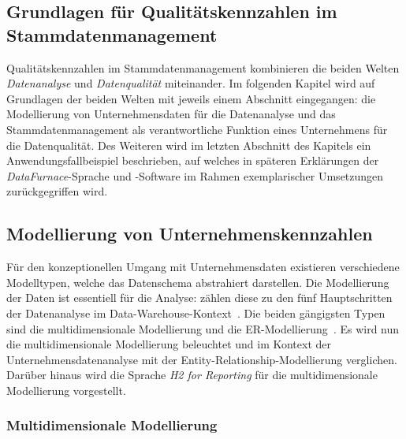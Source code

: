 \documentclass[
  language=german, %
  type=bachelor,%
  ngerman
]{isthesis}
\begin{document}
\begin{content}
  \chapter{Grundlagen für Qualitätskennzahlen im Stammdatenmanagement}\label{ch:grundlagen}
  

  Qualitätskennzahlen im Stammdatenmanagement kombinieren die
  beiden Welten \textit{Datenanalyse} und \textit{Datenqualität} miteinander.
  Im folgenden Kapitel wird auf Grundlagen der beiden Welten mit jeweils einem
  Abschnitt eingegangen: die Modellierung von Unternehmensdaten für die
  Datenanalyse und das Stammdatenmanagement als verantwortliche Funktion eines
  Unternehmens für die Datenqualität. Des Weiteren wird im letzten Abschnitt des
  Kapitels ein Anwendungsfallbeispiel beschrieben, auf welches in späteren
  Erklärungen der \textit{DataFurnace}-Sprache und -Software im Rahmen
  exemplarischer Umsetzungen zurückgegriffen wird.

  \section{Modellierung von Unternehmenskennzahlen}\label{sec:modellierung}

  Für den konzeptionellen Umgang mit Unternehmensdaten existieren verschiedene
  Modelltypen, welche das Datenschema abstrahiert darstellen.  Die Modellierung
  der Daten ist essentiell für die Analyse:
  \textsc{\citeauthor{phipps2002automating}} zählen diese zu den fünf
  Hauptschritten der Datenanalyse im Data-Warehouse-Kontext~\cite[][S.
  1]{phipps2002automating}. Die beiden gängigsten Typen sind die
  multidimensionale Modellierung und die \acrlong{ER}-Modellierung~\cite[][S.
  36]{ballard1998data}. Es wird nun die multidimensionale Modellierung
  beleuchtet und im Kontext der Unternehmensdatenanalyse mit der
  Entity-Relationship-Modellierung verglichen. Darüber hinaus wird die Sprache
  \textit{H2 for Reporting} für die multidimensionale Modellierung vorgestellt.


  \subsection{Multidimensionale
  Modellierung}\label{subsec:multidimensionale-modellierung} 


\end{content}
\end{document}
